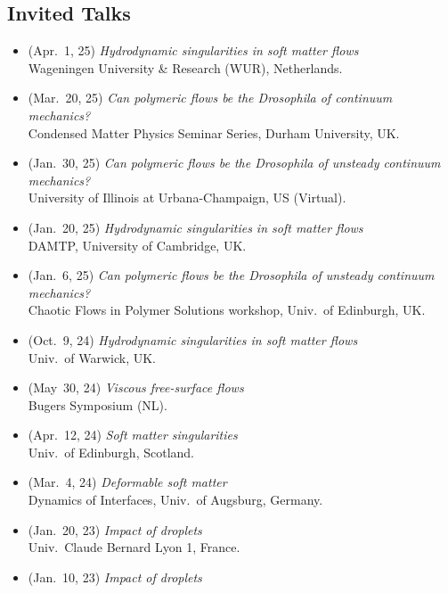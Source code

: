 \documentclass[10pt,a4paper,colorlinks,linkcolor=blue,urlcolor=blue,citecolor=blue]{moderncv}
\begin{document}
\subsection{\faMicrophone\hspace{0.3em}Invited Talks}
\begin{itemize}[leftmargin=1.5em]
\item[\textbullet] (Apr.~1, 25) \emph{Hydrodynamic singularities in soft matter flows} \\
  Wageningen University \& Research (WUR), Netherlands.
\item[\textbullet] (Mar.~20, 25) \emph{Can polymeric flows be the Drosophila of continuum mechanics?} \\
  Condensed Matter Physics Seminar Series, Durham University, UK.
\item[\textbullet] (Jan.~30, 25) \emph{Can polymeric flows be the Drosophila of unsteady continuum mechanics?} \\
  University of Illinois at Urbana-Champaign, US (Virtual).
\item[\textbullet] (Jan.~20, 25) \emph{Hydrodynamic singularities in soft matter flows} \\
  DAMTP, University of Cambridge, UK.
\item[\textbullet] (Jan.~6, 25) \emph{Can polymeric flows be the Drosophila of unsteady continuum mechanics?}\\
  Chaotic Flows in Polymer Solutions workshop, Univ.~of Edinburgh, UK.
\item[\textbullet] (Oct.~9, 24) \emph{Hydrodynamic singularities in soft matter flows} \\
  Univ.~of Warwick, UK.
\item[\textbullet] (May~30, 24) \emph{Viscous free-surface flows} \\
  Bugers Symposium (NL).
\item[\textbullet] (Apr.~12, 24) \emph{Soft matter singularities} \\
  Univ.~of Edinburgh, Scotland.
\item[\textbullet] (Mar.~4, 24) \emph{Deformable soft matter} \\
  Dynamics of Interfaces, Univ.~of Augsburg, Germany.
\item[\textbullet] (Jan.~20, 23) \emph{Impact of droplets} \\
  Univ.~Claude Bernard Lyon 1, France.
\item[\textbullet] (Jan.~10, 23) \emph{Impact of droplets} \\

\end{itemize}
\end{document}
